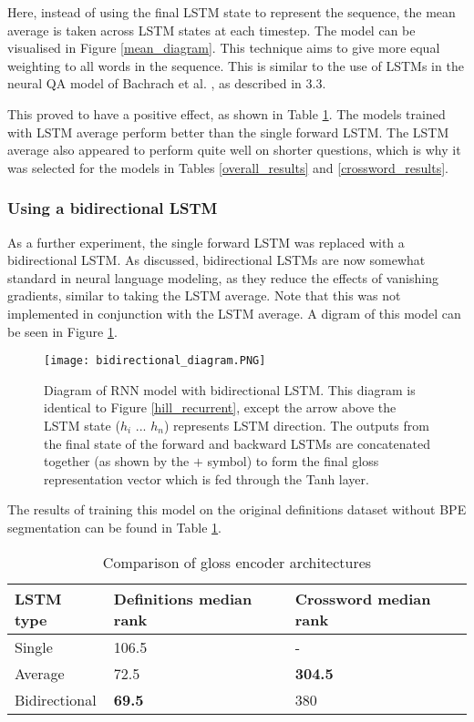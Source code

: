 \documentclass[11pt]{article}
\begin{document}
\begin{spacing}{1}
Here, instead of using the final LSTM state to represent the sequence, the mean average is taken across LSTM states at each timestep. The model can be visualised in Figure \ref{mean_diagram}. This technique aims to give more equal weighting to all words in the sequence. This is similar to the use of LSTMs in the neural QA model of Bachrach et al. \citeyear{bachrach2017attention}, as described in 3.3.

This proved to have a positive effect, as shown in Table \ref{bidirectional_comparison}. The models trained with LSTM average perform better than the single forward LSTM. The LSTM average also appeared to perform quite well on shorter questions, which is why it was selected for the models in Tables \ref{overall_results} and \ref{crossword_results}.

\subsubsection{Using a bidirectional LSTM}
As a further experiment, the single forward LSTM was replaced with a bidirectional LSTM. As discussed, bidirectional LSTMs are now somewhat standard in neural language modeling, as they reduce the effects of vanishing gradients, similar to taking the LSTM average. Note that this was not implemented in conjunction with the LSTM average. A digram of this model can be seen in Figure \ref{bidirectional_diagram}.  

\begin{figure}[!htpb]
\centering
\texttt{[image: bidirectional\_diagram.PNG]}
\caption{Diagram of RNN model with bidirectional LSTM.
This diagram is identical to Figure \ref{hill_recurrent}, except the arrow above the LSTM state ($h_i$ ... $h_n$) represents LSTM direction. The outputs from the final state of the forward and backward LSTMs are concatenated together (as shown by the $+$ symbol) to form the final gloss representation vector which is fed through the Tanh layer.}
\label{bidirectional_diagram}
\end{figure}

The results of training this model on the original definitions dataset without BPE segmentation can be found in Table \ref{bidirectional_comparison}.

\begin{table}[!htpb]
\caption{Comparison of gloss encoder architectures}
\centering
\begin{tabular}{lll}
\toprule
LSTM type     & Definitions median rank & Crossword median rank \\\midrule
Single        & 106.5              & -                \\
Average       & 72.5               & \textbf{304.5}   \\
Bidirectional & \textbf{69.5}      & 380             
\end{tabular}
\label{bidirectional_comparison}


\end{table}
\end{spacing}
\end{document}
